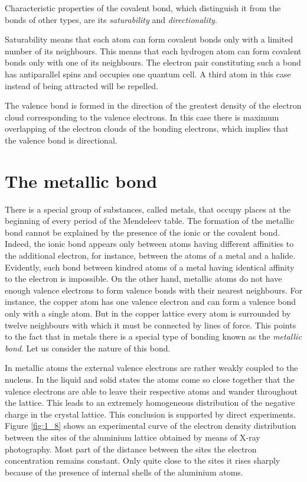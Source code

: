 Characteristic properties of the covalent bond, which distinguish it from the bonds of other types, are its \textit{saturability} and \textit{directionality}.

Saturability means that each atom can form covalent bonds only with a limited number of its neighbours. This means that each hydrogen atom can form covalent bonds only with one of its neighbours. The electron pair constituting such a bond has antiparallel spins and occupies one quantum cell. A third atom in this case instead of being attracted will be repelled.

The valence bond is formed in the direction of the greatest density of the electron cloud corresponding to the valence electrons. In this case there is maximum overlapping of the electron clouds of the bonding electrons, which implies that the valence bond is directional.

\section{The metallic bond}\label{sec:4}

There is a special group of substances, called metals, that occupy places at the beginning of every period of the Mendeleev table. The formation of the metallic bond cannot be explained by the presence of the ionic or the covalent bond. Indeed, the ionic bond appears only between atoms having different affinities to the additional electron, for instance, between the atoms of a metal and a halide. Evidently, such bond between kindred atoms of a metal having identical affinity to the electron is impossible. On the other hand, metallic atoms do not have enough valence electrons to form valence bonds with their nearest neighbours. For instance, the copper atom has one valence electron and can form a valence bond only with a single atom. But in the copper lattice every atom is surrounded by twelve neighbours with which it must be connected by lines of force. This points to the fact that in metals there is a special type of bonding known as the \textit{metallic bond}. Let us consider the nature of this bond.

In metallic atoms the external valence electrons are rather weakly coupled to the nucleus. In the liquid and solid states the atoms come so close together that the valence electrons are able to leave their respective atoms and wander throughout the lattice. This leads to an extremely homogeneous distribution of the negative charge in the crystal lattice. This conclusion is supported by direct experiments. Figure \ref{fig:1_8} shows an experimental curve of the electron density distribution between the sites of the aluminium lattice obtained by means of X-ray photography. Most part of the distance between the sites the electron concentration remains constant. Only quite close to the sites it rises sharply because of the presence of internal shells of the aluminium atoms.

